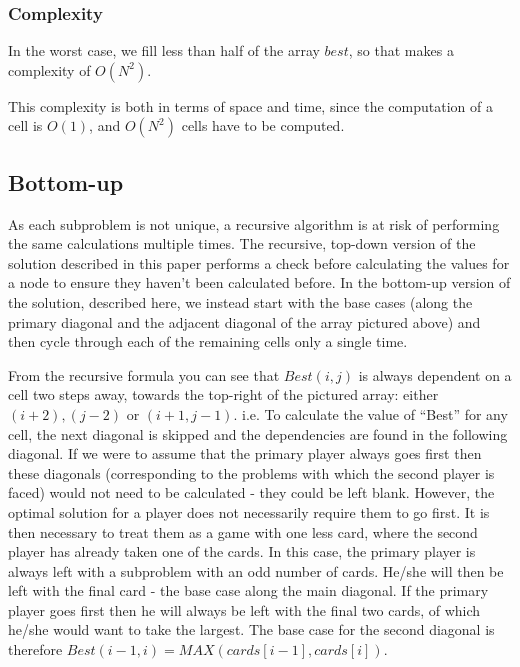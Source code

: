 \documentclass[11pt]{article}
\begin{document}
\subsubsection{Complexity}
In the worst case, we fill less than half of the array $best$, so that
makes a complexity of $O(N^2)$.

This complexity is both in terms of space and time, since the computation
of a cell is $O(1)$, and $O(N^2)$ cells have to be computed.

\subsection{Bottom-up}
As each subproblem is not unique, a recursive algorithm is at risk of performing the same calculations multiple times. The recursive, top-down version of the solution described in this paper performs a check before calculating the values for a node to ensure they haven't been calculated before. In the bottom-up version of the solution, described here, we instead start with the base cases (along the primary diagonal and the adjacent diagonal of the array pictured above) and then cycle through each of the remaining cells only a single time.

From the recursive formula you can see that $Best(i, j)$ is always dependent on a cell two steps away, towards the top-right of the pictured
array: either $(i+2), (j-2)$ or $(i+1, j-1)$. i.e. To calculate the value of ``Best'' for any cell, the next diagonal is skipped and the 
dependencies are found in the following diagonal. If we were to assume that the primary player always goes first then these diagonals 
(corresponding to the problems with which the second player is faced) would not need to be calculated - 
they could be left blank. However, the optimal solution for a player does not necessarily require them to go first. It is 
then necessary to treat them as a game with one less card, where the second player has already taken one of the cards. 
In this case, the primary player is always left with a subproblem with an odd number of cards. He/she will then 
be left with the final card - the base case along the main diagonal. If the primary player goes first then he will always 
be left with the final two cards, of which he/she would want to take the largest. The base case for the 
second diagonal is therefore $Best(i-1, i) = MAX(cards[i-1], cards[i])$.
\end{document}
